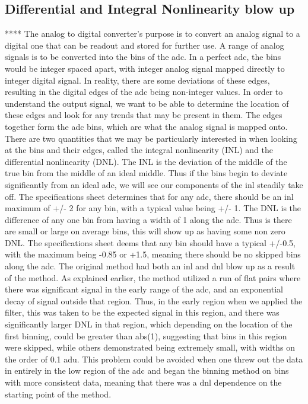\documentclass[11pt, letterpaper]{article}
\begin{document}
\subsection{Differential and Integral Nonlinearity blow up}
**** The analog to digital converter’s purpose is to convert an analog signal to a digital one that can be readout and stored for further use. A range of analog signals is to be converted into the bins of the adc. In a perfect adc, the bins would be integer spaced apart, with integer analog signal mapped directly to integer digital signal. In reality, there are some deviations of these edges, resulting in the digital edges of the adc being non-integer values. In order to understand the output signal, we want to be able to determine the location of these edges and look for any trends that may be present in them. The edges together form the adc bins, which are what the analog signal is mapped onto. There are two quantities that we may be particularly interested in when looking at the bins and their edges, called the integral nonlinearity (INL) and the differential nonlinearity (DNL). 
The INL is the deviation of the middle of the true bin from the middle of an ideal middle. Thus if the bins begin to deviate significantly from an ideal adc, we will see our components of the inl steadily take off. The specifications sheet determines that for any adc, there should be an inl maximum of +/- 2 for any bin, with a typical value being +/- 1. 
The DNL is the difference of any one bin from having a width of 1 along the adc. Thus is there are small or large on average bins, this will show up as having some non zero DNL. The specifications sheet deems that any bin should have a typical +/-0.5, with the maximum being -0.85 or +1.5, meaning there should be no skipped bins along the adc. 
The original method had both an inl and dnl blow up as a result of the method. As explained earlier, the method utilized a run of flat pairs where there was significant signal in the early range of the adc, and an exponential decay of signal outside that region. Thus, in the early region when we applied the filter, this was taken to be the expected signal in this region, and there was significantly larger DNL in that region, which depending on the location of the first binning, could be greater than abs(1), suggesting that bins in this region were skipped, while others demonstrated being extremely small, with widths on the order of 0.1 adu. This problem could be avoided when one threw out the data in entirely in the low region of the adc and began the binning method on bins with more consistent data, meaning that there was a dnl dependence on the starting point of the method. 
\end{document}
